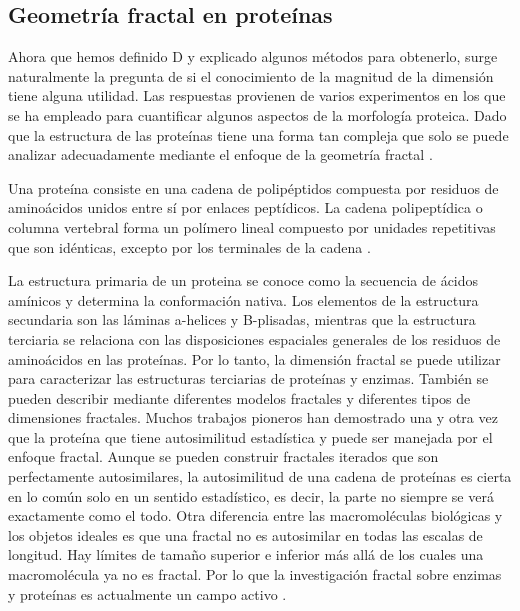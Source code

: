 \documentclass[11pt]{article}
\begin{document}
\subsection{Geometr\'{i}a fractal en prote\'{i}nas}

Ahora que hemos definido D y explicado algunos m\'{e}todos para obtenerlo, surge naturalmente la pregunta de si el conocimiento de la magnitud de la dimensi\'{o}n tiene alguna utilidad. Las respuestas provienen de varios experimentos en los que se ha empleado para cuantificar algunos aspectos de la morfolog\'{i}a proteica. Dado que la estructura de las prote\'{i}nas tiene una forma tan compleja que solo se puede analizar adecuadamente mediante el enfoque de la geometr\'{i}a fractal \cite{Mustafa1996}. 

Una prote\'{i}na consiste en una cadena de polip\'{e}ptidos compuesta por residuos de amino\'{a}cidos unidos entre s\'{i} por enlaces pept\'{i}dicos. La cadena polipept\'{i}dica o columna vertebral forma un pol\'{i}mero lineal compuesto por unidades repetitivas que son id\'{e}nticas, excepto por los terminales de la cadena \cite{Mustafa1996}.

La estructura primaria de un proteina se conoce como la secuencia de \'{a}cidos am\'{i}nicos y determina la conformaci\'{o}n nativa. Los elementos de la estructura secundaria son las l\'{a}minas a-helices y B-plisadas, mientras que la estructura terciaria se relaciona con las disposiciones espaciales generales de los residuos de amino\'{a}cidos en las prote\'{i}nas. Por lo tanto, la dimensi\'{o}n fractal se puede utilizar para caracterizar las estructuras terciarias de prote\'{i}nas y enzimas. Tambi\'{e}n se pueden describir mediante diferentes modelos fractales y diferentes tipos de dimensiones fractales. Muchos trabajos pioneros han demostrado una y otra vez que la prote\'{i}na que tiene autosimilitud estad\'{i}stica y puede ser manejada por el enfoque fractal. Aunque se pueden construir fractales iterados que son perfectamente autosimilares, la autosimilitud de una cadena de prote\'{i}nas es cierta en lo com\'{u}n solo en un sentido estad\'{i}stico, es decir, la parte no siempre se ver\'{a} exactamente como el todo. Otra diferencia entre las macromol\'{e}culas biol\'{o}gicas y los objetos ideales es que una fractal no es autosimilar en todas las escalas de longitud. Hay l\'{i}mites de tamaño superior e inferior m\'{a}s all\'{a} de los cuales una macromol\'{e}cula ya no es fractal. Por lo que la investigaci\'{o}n fractal sobre enzimas y prote\'{i}nas es actualmente un campo activo \cite{Mustafa1996}. 
\end{document}
